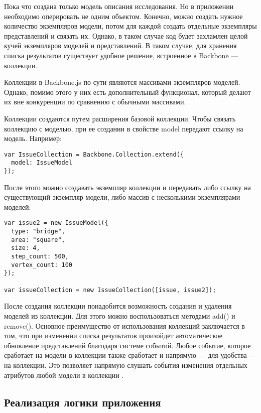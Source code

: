 Пока что создана только модель описания исследования. Но в приложении необходимо оперировать не одним объектом. Конечно, можно создать нужное количество экземпляров модели, потом для каждой создать отдельные экземпляры представлений и связать их. Однако, в таком случае код будет захламлен целой кучей экземпляров моделей и представлений. В таком случае, для хранения списка результатов существует удобное решение, встроенное в Backbone --- коллекции.

Коллекции в Backbone.js по сути являются массивами экземпляров моделей. Однако, помимо этого у них есть дополнительный функционал, который делают их вне конкуренции по сравнению с обычными массивами.

Коллекции создаются путем расширения базовой коллекции. Чтобы связать коллекцию с моделью, при ее создании в свойстве model передают ссылку на модель. Например:
\begin{lstlisting}
var IssueCollection = Backbone.Collection.extend({
  model: IssueModel
});
\end{lstlisting}

После этого можно создавать экземпляр коллекции и передавать либо ссылку на существующий экземпляр модели, либо массив с несколькими экземплярами моделей:
\begin{lstlisting}
var issue2 = new IssueModel({
  type: "bridge",
  area: "square",
  size: 4,
  step_count: 500,
  vertex_count: 100
});

var issueCollection = new IssueCollection([issue, issue2]);
\end{lstlisting}

После создания коллекции понадобится возможность создания и удаления моделей из коллекции. Для этого можно воспользоваться методами add() и remove(). Основное преимущество от использования коллекций заключается в том, что при изменении списка результатов произойдет автоматическое обновление представлений благодаря системе событий. Любое событие, которое сработает на модели в коллекции также сработает и напрямую --- для удобства --- на коллекции. Это позволяет напрямую слушать события изменения отдельных атрибутов любой модели в коллекции \cite{backbone}.

\subsection{Реализация логики приложения}

